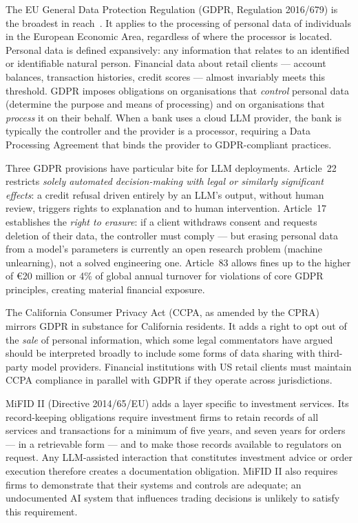 The EU General Data Protection Regulation (GDPR, Regulation 2016/679) is the broadest in reach~\citep{gdpr2016}. It applies to the processing of personal data of individuals in the European Economic Area, regardless of where the processor is located. Personal data is defined expansively: any information that relates to an identified or identifiable natural person. Financial data about retail clients — account balances, transaction histories, credit scores — almost invariably meets this threshold. GDPR imposes obligations on organisations that \emph{control} personal data (determine the purpose and means of processing) and on organisations that \emph{process} it on their behalf. When a bank uses a cloud LLM provider, the bank is typically the controller and the provider is a processor, requiring a Data Processing Agreement that binds the provider to GDPR-compliant practices.

Three GDPR provisions have particular bite for LLM deployments. Article~22 restricts \emph{solely automated decision-making with legal or similarly significant effects}: a credit refusal driven entirely by an LLM's output, without human review, triggers rights to explanation and to human intervention. Article~17 establishes the \emph{right to erasure}: if a client withdraws consent and requests deletion of their data, the controller must comply — but erasing personal data from a model's parameters is currently an open research problem (machine unlearning), not a solved engineering one. Article~83 allows fines up to the higher of €20 million or 4\% of global annual turnover for violations of core GDPR principles, creating material financial exposure.

The California Consumer Privacy Act (CCPA, as amended by the CPRA) mirrors GDPR in substance for California residents. It adds a right to opt out of the \emph{sale} of personal information, which some legal commentators have argued should be interpreted broadly to include some forms of data sharing with third-party model providers. Financial institutions with US retail clients must maintain CCPA compliance in parallel with GDPR if they operate across jurisdictions.

MiFID II (Directive 2014/65/EU) adds a layer specific to investment services. Its record-keeping obligations require investment firms to retain records of all services and transactions for a minimum of five years, and seven years for orders~\citep{esma2018mifid2} — in a retrievable form — and to make those records available to regulators on request. Any LLM-assisted interaction that constitutes investment advice or order execution therefore creates a documentation obligation. MiFID II also requires firms to demonstrate that their systems and controls are adequate; an undocumented AI system that influences trading decisions is unlikely to satisfy this requirement.

